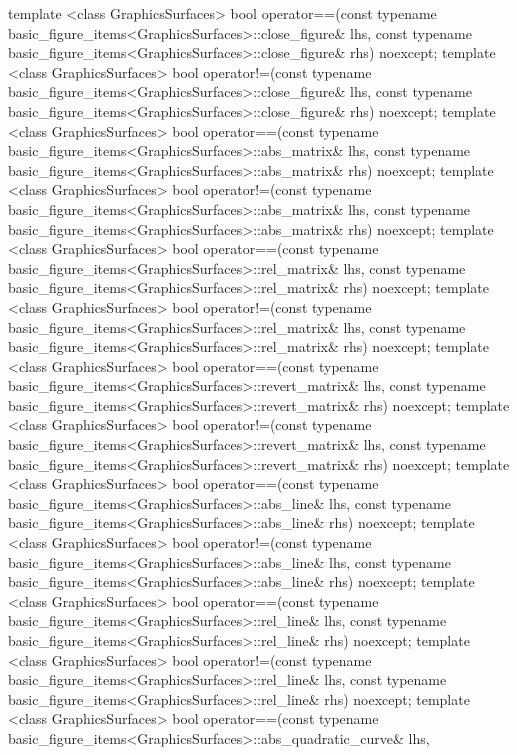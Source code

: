 \begin{codeblock}
{  template <class GraphicsSurfaces>
  bool operator==(const typename basic_figure_items<GraphicsSurfaces>::close_figure& lhs,
    const typename basic_figure_items<GraphicsSurfaces>::close_figure& rhs) noexcept;
  template <class GraphicsSurfaces>
  bool operator!=(const typename basic_figure_items<GraphicsSurfaces>::close_figure& lhs,
    const typename basic_figure_items<GraphicsSurfaces>::close_figure& rhs) noexcept;
  template <class GraphicsSurfaces>
  bool operator==(const typename basic_figure_items<GraphicsSurfaces>::abs_matrix& lhs,
    const typename basic_figure_items<GraphicsSurfaces>::abs_matrix& rhs) noexcept;
  template <class GraphicsSurfaces>
  bool operator!=(const typename basic_figure_items<GraphicsSurfaces>::abs_matrix& lhs,
    const typename basic_figure_items<GraphicsSurfaces>::abs_matrix& rhs) noexcept;
  template <class GraphicsSurfaces>
  bool operator==(const typename basic_figure_items<GraphicsSurfaces>::rel_matrix& lhs,
    const typename basic_figure_items<GraphicsSurfaces>::rel_matrix& rhs) noexcept;
  template <class GraphicsSurfaces>
  bool operator!=(const typename basic_figure_items<GraphicsSurfaces>::rel_matrix& lhs,
    const typename basic_figure_items<GraphicsSurfaces>::rel_matrix& rhs) noexcept;
  template <class GraphicsSurfaces>
  bool operator==(const typename basic_figure_items<GraphicsSurfaces>::revert_matrix& lhs,
    const typename basic_figure_items<GraphicsSurfaces>::revert_matrix& rhs) noexcept;
  template <class GraphicsSurfaces>
  bool operator!=(const typename basic_figure_items<GraphicsSurfaces>::revert_matrix& lhs,
    const typename basic_figure_items<GraphicsSurfaces>::revert_matrix& rhs) noexcept;
  template <class GraphicsSurfaces>
  bool operator==(const typename basic_figure_items<GraphicsSurfaces>::abs_line& lhs,
    const typename basic_figure_items<GraphicsSurfaces>::abs_line& rhs) noexcept;
  template <class GraphicsSurfaces>
  bool operator!=(const typename basic_figure_items<GraphicsSurfaces>::abs_line& lhs,
    const typename basic_figure_items<GraphicsSurfaces>::abs_line& rhs) noexcept;
  template <class GraphicsSurfaces>
  bool operator==(const typename basic_figure_items<GraphicsSurfaces>::rel_line& lhs,
    const typename basic_figure_items<GraphicsSurfaces>::rel_line& rhs) noexcept;
  template <class GraphicsSurfaces>
  bool operator!=(const typename basic_figure_items<GraphicsSurfaces>::rel_line& lhs,
    const typename basic_figure_items<GraphicsSurfaces>::rel_line& rhs) noexcept;
  template <class GraphicsSurfaces>
  bool operator==(const typename basic_figure_items<GraphicsSurfaces>::abs_quadratic_curve& lhs,
}
\end{codeblock}
